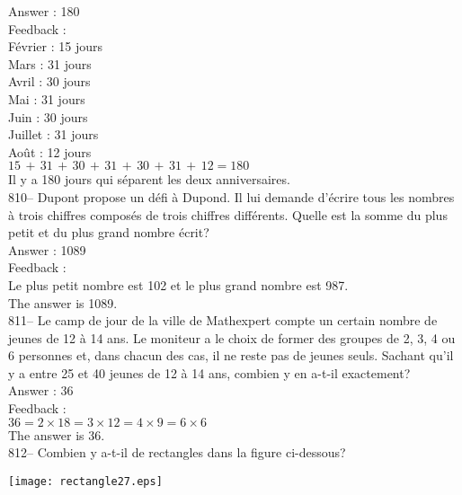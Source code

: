 ﻿\documentclass[letterpaper, 12pt]{article}
\begin{document}
Answer : 180\\

Feedback : \\
F\'evrier : 15 jours\\
Mars : 31 jours\\
Avril : 30 jours\\
Mai : 31 jours\\
Juin : 30 jours\\
Juillet : 31 jours\\
Ao\^ut : 12 jours\\

$15\,+\,31\,+\,30\,+\,31\,+\,30\,+\,31\,+\,12=180$\\

Il y a 180 jours qui s\'eparent les deux anniversaires.\\

810-- Dupont propose un d\'efi \`a Dupond.  Il lui demande d'\'ecrire tous
les nombres \`a trois chiffres compos\'es de trois chiffres diff\'erents.
Quelle est la somme du plus petit et du plus grand nombre \'ecrit?\\

Answer : 1089\\

Feedback : \\
Le plus petit nombre est 102 et le plus grand nombre est 987.\\
The answer is 1089.\\

811-- Le camp de jour de la ville de Mathexpert compte un certain nombre de
jeunes de 12 \`a 14 ans.  Le moniteur a le choix de former des groupes de 2,
3, 4 ou 6 personnes et, dans chacun des cas, il ne reste pas de jeunes
seuls.  Sachant qu'il y a entre 25 et 40 jeunes de 12 \`a 14 ans, combien y
en a-t-il exactement?\\

Answer : 36\\

Feedback : \\
$36=2\times18=3\times12=4\times9=6\times6$\\
The answer is 36.\\

812-- Combien y a-t-il de rectangles dans la figure ci-dessous?\\
    \begin{center}
    \texttt{[image: rectangle27.eps]}
    \end{center}
\end{document}
